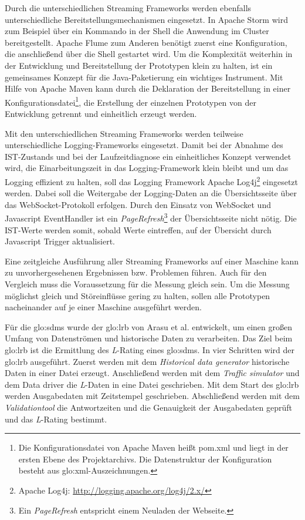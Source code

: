 Durch die unterschiedlichen Streaming Frameworks werden ebenfalls unterschiedliche Bereitstellungsmechanismen eingesetzt. In Apache Storm wird zum Beispiel über ein Kommando in der Shell die Anwendung im Cluster bereitgestellt. Apache Flume zum Anderen benötigt zuerst eine Konfiguration, die anschließend über die Shell gestartet wird. Um die Komplexität weiterhin in der Entwicklung und Bereitstellung der Prototypen klein zu halten, ist ein gemeinsames Konzept für die Java-Paketierung ein wichtiges Instrument. Mit Hilfe von Apache Maven kann durch die Deklaration der Bereitstellung in einer Konfigurationsdatei\footnote{Die Konfigurationsdatei von Apache Maven heißt pom.xml und liegt in der ersten Ebene des Projektarchivs. Die Datenstruktur der Konfiguration besteht aus \gls{glo:xml}-Auszeichnungen. }, die Erstellung der einzelnen Prototypen von der Entwicklung getrennt und einheitlich erzeugt werden.

Mit den unterschiedlichen Streaming Frameworks werden teilweise unterschiedliche Logging-Frameworks eingesetzt. Damit bei der Abnahme des IST-Zustands und bei der Laufzeitdiagnose ein einheitliches Konzept verwendet wird, die Einarbeitungszeit in das Logging-Framework klein bleibt und um das Logging effizient zu halten, soll das Logging Framework Apache Log4j\footnote{Apache Log4j: \url{http://logging.apache.org/log4j/2.x/}} eingesetzt werden. Dabei soll die Weitergabe der Logging-Daten an die Übersichtsseite über das WebSocket-Protokoll erfolgen. Durch den Einsatz von WebSocket und Javascript EventHandler ist ein \textit{PageRefresh}\footnote{Ein \textit{PageRefresh} entspricht einem Neuladen der Webseite.} der Übersichtsseite nicht nötig. Die IST-Werte werden somit, sobald Werte eintreffen, auf der Übersicht durch Javascript Trigger aktualisiert.

Eine zeitgleiche Ausführung aller Streaming Frameworks auf einer Maschine kann zu unvorhergesehenen Ergebnissen bzw. Problemen führen. Auch für den Vergleich muss die Voraussetzung für die Messung gleich sein. Um die Messung möglichst gleich und Störeinflüsse gering zu halten, sollen alle Prototypen nacheinander auf je einer Maschine ausgeführt werden.

Für die \gls{glo:sdms} wurde der \gls{glo:lrb} von Arasu et al.  entwickelt, um einen großen Umfang von Datenströmen und historische Daten zu verarbeiten. Das Ziel beim \gls{glo:lrb} ist die Ermittlung des \textit{L}-Rating eines \gls{glo:sdms}. In vier Schritten wird der \gls{glo:lrb} ausgeführt. Zuerst werden mit dem \textit{Historical data generator} historische Daten in einer Datei erzeugt. Anschließend werden mit dem \textit{Traffic simulator} und dem Data driver die \textit{L}-Daten in eine Datei geschrieben. Mit dem Start des \gls{glo:lrb} werden Ausgabedaten mit Zeitstempel geschrieben. Abschließend werden mit dem \textit{Validationtool} die Antwortzeiten und die Genauigkeit der Ausgabedaten geprüft und das \textit{L}-Rating bestimmt. 

